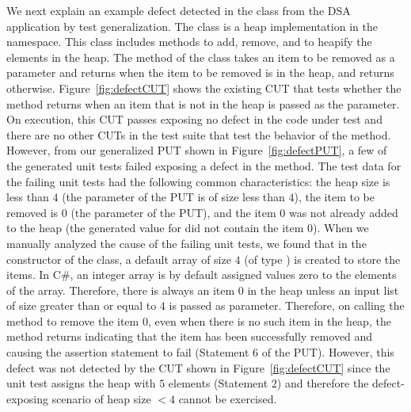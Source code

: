 We next explain an example defect detected in the  class from the DSA application by test generalization. The  class is a heap implementation in the  namespace. This class includes methods to add, remove, and to heapify the elements in the heap. The  method of the class takes an item to be removed as a parameter and returns  when the item to be removed is in the heap, and returns  otherwise. Figure~\ref{fig:defectCUT} shows the existing CUT that tests whether the  method returns  when an item that is not in the heap is passed as the parameter. On execution, this CUT passes exposing no defect in the code under test and there are no other CUTs in the test suite that test the behavior of the method. However, from our generalized PUT shown in Figure~\ref{fig:defectPUT}, a few of the generated unit tests failed exposing a defect in the  method. The test data for the failing unit tests had the following common characteristics: the heap size is less than $4$ (the  parameter of the PUT is of size less than $4$), the item to be removed is $0$ (the  parameter of the PUT), and the item $0$ was not already added to the heap (the generated value for  did not contain the item $0$). When we manually analyzed the cause of the failing unit tests, we found that in the constructor of the  class, a default array of size $4$ (of type ) is created to store the items. In C\#, an integer array is by default assigned values zero to the elements of the array. Therefore, there is always an item $0$ in the heap unless an input list of size greater than or equal to $4$ is passed as parameter. Therefore, on calling the  method to remove the item $0$, even when there is no such item in the heap, the method returns  indicating that the item has been successfully removed and causing the assertion statement to fail (Statement $6$ of the PUT). However, this defect was not detected by the CUT shown in Figure~\ref{fig:defectCUT} since the unit test assigns the heap with $5$ elements (Statement $2$) and therefore the defect-exposing scenario of heap size $< 4$ cannot be exercised. 

